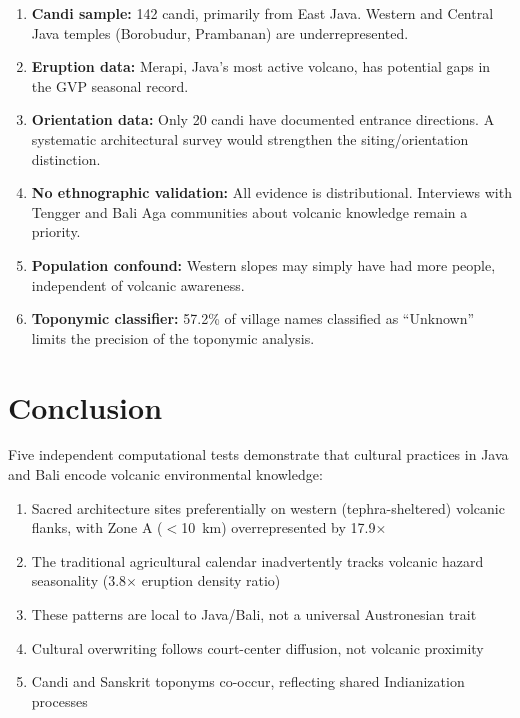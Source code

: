 \documentclass[12pt,a4paper]{article}
\begin{document}
\begin{enumerate}
    \item \textbf{Candi sample:} 142 candi, primarily from East Java. Western and Central Java temples (Borobudur, Prambanan) are underrepresented.
    \item \textbf{Eruption data:} Merapi, Java's most active volcano, has potential gaps in the GVP seasonal record.
    \item \textbf{Orientation data:} Only 20 candi have documented entrance directions. A systematic architectural survey would strengthen the siting/orientation distinction.
    \item \textbf{No ethnographic validation:} All evidence is distributional. Interviews with Tengger and Bali Aga communities about volcanic knowledge remain a priority.
    \item \textbf{Population confound:} Western slopes may simply have had more people, independent of volcanic awareness.
    \item \textbf{Toponymic classifier:} 57.2\% of village names classified as ``Unknown'' limits the precision of the toponymic analysis.
\end{enumerate}

\section{Conclusion}

Five independent computational tests demonstrate that cultural practices in Java and Bali encode volcanic environmental knowledge:

\begin{enumerate}
    \item Sacred architecture sites preferentially on western (tephra-sheltered) volcanic flanks, with Zone A ($<$10~km) overrepresented by 17.9$\times$
    \item The traditional agricultural calendar inadvertently tracks volcanic hazard seasonality (3.8$\times$ eruption density ratio)
    \item These patterns are local to Java/Bali, not a universal Austronesian trait
    \item Cultural overwriting follows court-center diffusion, not volcanic proximity
    \item Candi and Sanskrit toponyms co-occur, reflecting shared Indianization processes
\end{enumerate}
\end{document}
